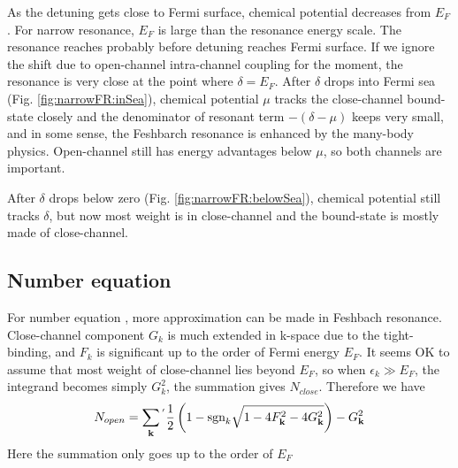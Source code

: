 As the detuning gets close to Fermi surface, chemical potential decreases from $E_{F}$. For narrow resonance, $E_{F}$ is large than the resonance energy scale.  The resonance reaches probably before detuning reaches Fermi surface.  If we ignore the shift due to open-channel intra-channel coupling for the moment, the resonance is very close at the point where $\delta=E_{F}$.  After $\delta$ drops into Fermi sea (Fig. \ref{fig:narrowFR:inSea}), chemical potential $\mu$ tracks the close-channel bound-state closely and the denominator of resonant term $-(\delta-\mu)$ keeps very small, and in some sense, the Feshbarch resonance is enhanced by the many-body  physics.  Open-channel still has energy advantages below $\mu$, so both channels are important.  

After $\delta$ drops below zero (Fig. \ref{fig:narrowFR:belowSea}), chemical potential still tracks $\delta$, but now most weight is in close-channel and the bound-state is mostly made of close-channel.  

\subsection{Number equation}
For number equation , more approximation can be made in Feshbach resonance.  Close-channel component $G_{k}$ is much extended in k-space due to the tight-binding, and $F_{k}$ is significant up to the order of Fermi energy $E_{F}$.  It seems OK to assume that most weight of close-channel lies beyond $E_{F}$, so when $\epsilon_{k}\gg{E_{F}}$, the integrand becomes simply $G_{k}^{2}$, the summation gives $N_{close}$.  Therefore we have 
\begin{equation}\label{eq:20100909:number}
N_{open}=\sum_{\mathbf{k}}{}^{'}\frac{1}{2} \left(1-\text{sgn}_{k}\sqrt{1-4 F_{\mathbf{k}}^2-4 G_{\mathbf{k}}^2}\right)-G_{\mathbf{k}}^{2}
\end{equation} 
Here the summation only goes up to the order of $E_{F}$